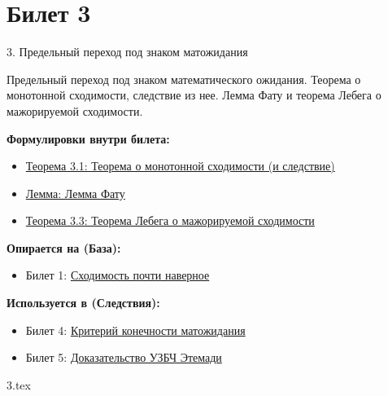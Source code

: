 \documentclass[a4paper, 12pt]{article}
\newcommand{\ticketsection}[1]{\vspace{0.5em}\noindent\textbf{\textcolor{ticketdark}{\sffamily #1}}\par}
\begin{document}
\section{Билет 3}
\begin{ticketskeleton}{3. Предельный переход под знаком матожидания}

     Предельный переход под знаком математического ожидания. Теорема о монотонной сходимости, следствие из нее. Лемма Фату и теорема Лебега о мажорируемой сходимости.

    \ticketsection{Формулировки внутри билета:}
    \begin{itemize}
        \item \hyperref[thm:monotone]{Теорема 3.1: Теорема о монотонной сходимости (и следствие)}
        \item \hyperref[lem:fatou]{Лемма: Лемма Фату}
        \item \hyperref[thm:lebesgue]{Теорема 3.3: Теорема Лебега о мажорируемой сходимости}
    \end{itemize}

    \ticketsection{Опирается на (База):}
    \begin{itemize}
        \item Билет 1: \hyperref[def:conv_as]{Сходимость почти наверное}
    \end{itemize}

    \ticketsection{Используется в (Следствия):}
    \begin{itemize}
        \item Билет 4: \hyperref[prop:crit_exp]{Критерий конечности матожидания}
        \item Билет 5: \hyperref[thm:slln_etemadi]{Доказательство УЗБЧ Этемади}
    \end{itemize}
\end{ticketskeleton}
{3.tex}
\end{document}

